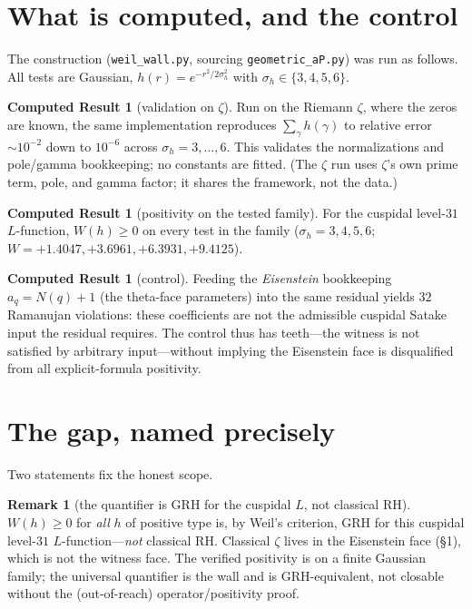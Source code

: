 \documentclass[11pt]{article}
\theoremstyle{definition}
\newtheorem{remark}[theorem]{Remark}
\newtheorem{result}[theorem]{Computed Result}
\begin{document}
\section{What is computed, and the control}
The construction (\texttt{weil\_wall.py}, sourcing \texttt{geometric\_aP.py}) was run as
follows. All tests are Gaussian, $h(r)=e^{-r^2/2\sigma_h^2}$ with $\sigma_h\in\{3,4,5,6\}$.

\begin{result}[validation on $\zeta$]\label{res:gate}
Run on the Riemann $\zeta$, where the zeros are known, the same implementation reproduces
$\sum_\gamma h(\gamma)$ to relative error $\sim10^{-2}$ down to $10^{-6}$ across
$\sigma_h=3,\dots,6$. This validates the normalizations and pole/gamma bookkeeping; no
constants are fitted. (The $\zeta$ run uses $\zeta$'s own prime term, pole, and gamma
factor; it shares the framework, not the data.)
\end{result}

\begin{result}[positivity on the tested family]\label{res:pos}
For the cuspidal level-$31$ $L$-function, $W(h)\ge 0$ on every test in the family
($\sigma_h=3,4,5,6$; $W=+1.4047,+3.6961,+6.3931,+9.4125$).
\end{result}

\begin{result}[control]\label{res:ctrl}
Feeding the \emph{Eisenstein} bookkeeping $a_q=N(q)+1$ (the theta-face parameters) into
the same residual yields $32$ Ramanujan violations: these coefficients are not the
admissible cuspidal Satake input the residual requires. The control thus has teeth---the
witness is not satisfied by arbitrary input---without implying the Eisenstein face is
disqualified from all explicit-formula positivity.
\end{result}

\section{The gap, named precisely}
Two statements fix the honest scope.

\begin{remark}[the quantifier is GRH for the cuspidal $L$, not classical RH]
$W(h)\ge 0$ for \emph{all} $h$ of positive type is, by Weil's criterion, GRH for this
cuspidal level-$31$ $L$-function---\emph{not} classical RH. Classical $\zeta$ lives in the
Eisenstein face (\S1), which is not the witness face. The verified positivity is on a
finite Gaussian family; the universal quantifier is the wall and is GRH-equivalent, not
closable without the (out-of-reach) operator/positivity proof.
\end{remark}
\end{document}

